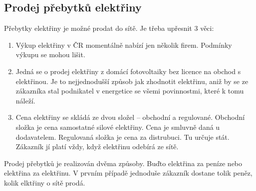 \subsection{Prodej přebytků elektřiny}
Přebytky elektřiny je možné prodat do sítě. Je třeba upřesnit 3 věci:

\begin{enumerate}
    \item Výkup elektřiny v ČR momentálně nabízí jen několik firem. Podmínky výkupu se mohou lišit.
    \item Jedná se o prodej elektřiny z domácí fotovoltaiky bez licence na obchod s elektřinou. Je to nejjednodušší způsob jak zhodnotit elektřinu, aniž by se ze zákazníka stal podnikatel v energetice se všemi povinnostmi, které k tomu náleží.
    \item Cena elektřiny se skládá ze dvou složel -- obchodní a regulované. Obchodní složka je cena samostatné silové elektřiny. Cena je smluvně daná u dodavatelem. Regulovaná složka je cena za distrubuci. Tu určuje stát. Zákazník jí platí vždy, když elektřinu odebírá ze sítě.
\end{enumerate}

Prodej přebytků je realizován dvěma způsoby. Buďto elektřina za peníze nebo elektřina za elektřinu.
V prvním případě jednoduše zákazník dostane tolik peněz, kolik elktřiny o sítě prodá.
